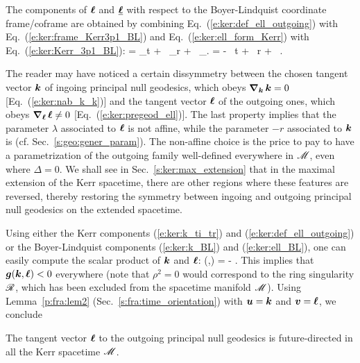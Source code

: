 The components of $\bm{\ell}$ and $\underline{\bm{\ell}}$ with respect to the Boyer-Lindquist coordinate frame/coframe
are obtained by combining Eq.~(\ref{e:ker:def_ell_outgoing}) with Eq.~(\ref{e:ker:frame_Kerr3p1_BL})
and Eq.~(\ref{e:ker:ell_form_Kerr}) with Eq.~(\ref{e:ker:Kerr_3p1_BL}):
\be \label{e:ker:ell_BL}
    \wl =  \wpar_t + \, \wpar_r
    + \, \wpar_\ph .
\ee
\be \label{e:ker:ell_form_BL}
    \uu{\el} = - \, \dd t
     + \,  \dd r
     +  \, \dd \ph .
\ee


\begin{remark} \label{r:ker:k_versus_l}
The reader may have noticed a certain dissymmetry between the chosen tangent vector
$\bm{k}$ of ingoing principal null geodesics, which obeys $\bm{\nabla}_{\bm{k}}\, \bm{k} = 0$
[Eq.~(\ref{e:ker:nab_k_k})] and the tangent vector $\bm{\ell}$ of the outgoing
ones, which obeys $\bm{\nabla}_{\bm{\ell}}\, \bm{\ell} \not= 0$ [Eq.~(\ref{e:ker:pregeod_ell})].
The last property implies that the
parameter $\lambda$ associated to $\bm{\ell}$ is not affine, while the
parameter $-r$ associated to $\bm{k}$ is (cf. Sec.~\ref{s:geo:gener_param}).
The non-affine choice is the price to pay to have a parametrization of the outgoing
family well-defined everywhere in $\mathscr{M}$, even where $\Delta=0$. We shall see in
Sec.~\ref{s:ker:max_extension} that in the maximal extension of the Kerr spacetime, there are other regions where these features are reversed,
thereby restoring the symmetry between ingoing and outgoing principal null geodesics
on the extended spacetime.
\end{remark}


Using either the Kerr components (\ref{e:ker:k_ti_tr}) and
(\ref{e:ker:def_ell_outgoing})
or the Boyer-Lindquist components (\ref{e:ker:k_BL}) and (\ref{e:ker:ell_BL}),
one can easily compute the scalar product of $\bm{k}$ and $\bm{\ell}$:
\be \label{e:ker:k_scal_ell}
    (,\wl) = -  .
\ee
This implies that $\bm{g}(\bm{k},\bm{\ell}) < 0$ everywhere (note that $\rho^2= 0$
would correspond to the ring singularity $\mathscr{R}$, which has been excluded from
the spacetime manifold $\mathscr{M}$).
Using Lemma~\ref{p:fra:lem2} (Sec.~\ref{s:fra:time_orientation}) with $\bm{u}=\bm{k}$ and
$\bm{v} = \bm{\ell}$, we conclude
\begin{prop}
The tangent vector $\bm{\ell}$ to the outgoing principal null geodesics
is future-directed in all the Kerr spacetime $\mathscr{M}$.
\end{prop}

